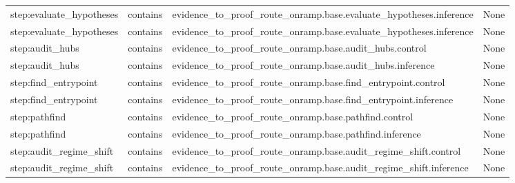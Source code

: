 \documentclass[10pt,a4paper]{article}
\begin{document}
\begin{longtable}{@{}>{\raggedright\arraybackslash}p{.24\linewidth}>{\raggedright\arraybackslash}p{.12\linewidth}>{\raggedright\arraybackslash}p{.24\linewidth}>{\raggedright\arraybackslash}p{.20\linewidth}@{}}
step:\allowbreak{}evaluate\_\allowbreak{}hypotheses\allowbreak{} & contains & evidence\_\allowbreak{}to\_\allowbreak{}proof\_\allowbreak{}route\_\allowbreak{}onramp.\allowbreak{}base.\allowbreak{}evaluate\_\allowbreak{}hypotheses\allowbreak{}.\allowbreak{}inference & None\\
step:\allowbreak{}evaluate\_\allowbreak{}hypotheses\allowbreak{} & contains & evidence\_\allowbreak{}to\_\allowbreak{}proof\_\allowbreak{}route\_\allowbreak{}onramp.\allowbreak{}base.\allowbreak{}evaluate\_\allowbreak{}hypotheses\allowbreak{}.\allowbreak{}inference & None\\
step:\allowbreak{}audit\_\allowbreak{}hubs & contains & evidence\_\allowbreak{}to\_\allowbreak{}proof\_\allowbreak{}route\_\allowbreak{}onramp.\allowbreak{}base.\allowbreak{}audit\_\allowbreak{}hubs.\allowbreak{}control & None\\
step:\allowbreak{}audit\_\allowbreak{}hubs & contains & evidence\_\allowbreak{}to\_\allowbreak{}proof\_\allowbreak{}route\_\allowbreak{}onramp.\allowbreak{}base.\allowbreak{}audit\_\allowbreak{}hubs.\allowbreak{}inference & None\\
step:\allowbreak{}find\_\allowbreak{}entrypoint\allowbreak{} & contains & evidence\_\allowbreak{}to\_\allowbreak{}proof\_\allowbreak{}route\_\allowbreak{}onramp.\allowbreak{}base.\allowbreak{}find\_\allowbreak{}entrypoint\allowbreak{}.\allowbreak{}control & None\\
step:\allowbreak{}find\_\allowbreak{}entrypoint\allowbreak{} & contains & evidence\_\allowbreak{}to\_\allowbreak{}proof\_\allowbreak{}route\_\allowbreak{}onramp.\allowbreak{}base.\allowbreak{}find\_\allowbreak{}entrypoint\allowbreak{}.\allowbreak{}inference & None\\
step:\allowbreak{}pathfind & contains & evidence\_\allowbreak{}to\_\allowbreak{}proof\_\allowbreak{}route\_\allowbreak{}onramp.\allowbreak{}base.\allowbreak{}pathfind.\allowbreak{}control & None\\
step:\allowbreak{}pathfind & contains & evidence\_\allowbreak{}to\_\allowbreak{}proof\_\allowbreak{}route\_\allowbreak{}onramp.\allowbreak{}base.\allowbreak{}pathfind.\allowbreak{}inference & None\\
step:\allowbreak{}audit\_\allowbreak{}regime\_\allowbreak{}shift & contains & evidence\_\allowbreak{}to\_\allowbreak{}proof\_\allowbreak{}route\_\allowbreak{}onramp.\allowbreak{}base.\allowbreak{}audit\_\allowbreak{}regime\_\allowbreak{}shift.\allowbreak{}control & None\\
step:\allowbreak{}audit\_\allowbreak{}regime\_\allowbreak{}shift & contains & evidence\_\allowbreak{}to\_\allowbreak{}proof\_\allowbreak{}route\_\allowbreak{}onramp.\allowbreak{}base.\allowbreak{}audit\_\allowbreak{}regime\_\allowbreak{}shift.\allowbreak{}inference & None\\

\end{longtable}
\end{document}
